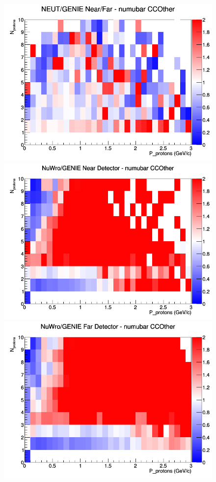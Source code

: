 \documentclass[12pt]{article}
\begin{document}
\begin{figure}[h]
\endminipage
{}
\includegraphics[width=\linewidth]{N_P/nominal/protons/ratios/CCOther_NEUT_GENIE_numubar_NF_N_P.png}
\endminipage
\newline
{}
\includegraphics[width=\linewidth]{N_P/nominal/protons/ratios/CCOther_NuWro_GENIE_numubar_near_N_P.png}
\endminipage
{}
\includegraphics[width=\linewidth]{N_P/nominal/protons/ratios/CCOther_NuWro_GENIE_numubar_far_N_P.png}

\end{figure}
\end{document}
